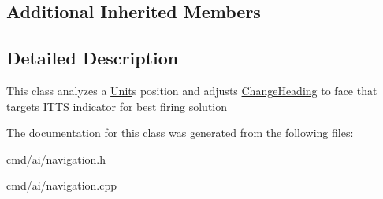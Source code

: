 \subsection*{Additional Inherited Members}


\subsection{Detailed Description}
This class analyzes a \hyperlink{classUnit}{Unit}\textquotesingle{}s position and adjusts \hyperlink{classOrders_1_1ChangeHeading}{Change\+Heading} to face that target\textquotesingle{}s I\+T\+TS indicator for best firing solution 

The documentation for this class was generated from the following files\+:\begin{DoxyCompactItemize}
\item 
cmd/ai/navigation.\+h\item 
cmd/ai/navigation.\+cpp\end{DoxyCompactItemize}
